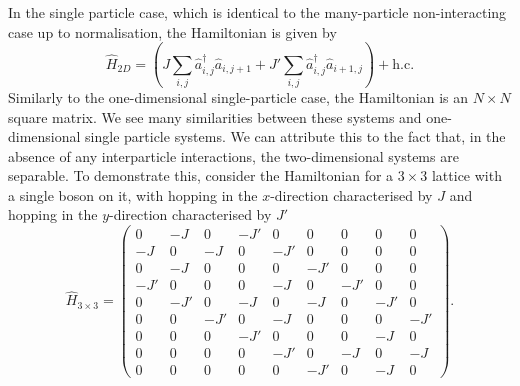 \documentclass[prb, twocolumn, final]{revtex4-1}
\theoremstyle{plain}
\begin{document}
In the single particle case, which is identical to the many-particle
non-interacting case up to normalisation, the Hamiltonian is given by
\begin{equation}
    \hat{H}_{2D}
    =
    \left (
        J \sum_{i,j}{\hat{a}^{\dagger}_{i,j} \hat{a}_{i,j+1}} +
        J'\sum_{i,j}{\hat{a}^{\dagger}_{i,j}   \hat{a}_{i+1,j}}
    \right )
    +
    \text{h.c.}
\end{equation}
Similarly to the one-dimensional single-particle case, the Hamiltonian is an $N
\times N$ square matrix. We see many similarities between these systems and
one-dimensional single particle systems. We can attribute this to the fact that,
in the absence of any interparticle interactions, the two-dimensional systems
are separable. To demonstrate this, consider the Hamiltonian for a $3 \times 3$
lattice with a single boson on it, with hopping in the $x$-direction
characterised by $J$ and hopping in the $y$-direction characterised by $J'$
\begin{equation}
    \hat{H}_{3\times3}
    =
    \begin{pmatrix}
         0  & -J  &  0  & -J' &  0  &  0  &  0  &  0  &  0  \\
        -J  &  0  & -J  &  0  & -J' &  0  &  0  &  0  &  0  \\
         0  & -J  &  0  &  0  &  0  & -J' &  0  &  0  &  0  \\
        -J' &  0  &  0  &  0  & -J  &  0  & -J' &  0  &  0  \\
         0  & -J' &  0  & -J  &  0  & -J  &  0  & -J' &  0  \\
         0  &  0  & -J' &  0  & -J  &  0  &  0  &  0  & -J' \\
         0  &  0  &  0  & -J' &  0  &  0  &  0  & -J  &  0  \\
         0  &  0  &  0  &  0  & -J' &  0  & -J  &  0  & -J  \\
         0  &  0  &  0  &  0  &  0  & -J' &  0  & -J  &  0
    \end{pmatrix}.
\end{equation}
\end{document}
